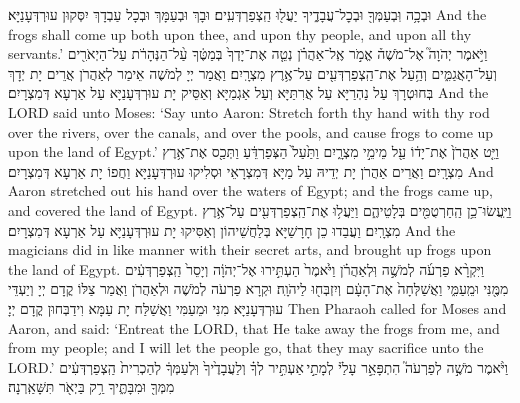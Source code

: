 {{וּבְכָ֥ה וּֽבְעַמְּךָ֖ וּבְכׇל־עֲבָדֶ֑יךָ יַעֲל֖וּ הַֽצְפַרְדְּעִֽים׃
}
{וּבָךְ וּבְעַמָּךְ וּבְכָל עַבְדָךְ יִסְּקוּן עוּרְדְּעָנַיָּא׃}
{And the frogs shall come up both upon thee, and upon thy people, and upon all thy servants.’}{}
\newperek
{}%
{וַיֹּ֣אמֶר יְהֹוָה֮ אֶל־מֹשֶׁה֒ אֱמֹ֣ר אֶֽל־אַהֲרֹ֗ן נְטֵ֤ה אֶת־יָדְךָ֙ בְּמַטֶּ֔ךָ עַ֨ל־הַנְּהָרֹ֔ת עַל־הַיְאֹרִ֖ים וְעַל־הָאֲגַמִּ֑ים וְהַ֥עַל אֶת־הַֽצְפַרְדְּעִ֖ים עַל־אֶ֥רֶץ מִצְרָֽיִם׃}
{וַאֲמַר יְיָ לְמֹשֶׁה אֵימַר לְאַהֲרֹן אֲרֵים יָת יְדָךְ בְּחוּטְרָךְ עַל נַהְרַיָּא עַל אֲרִתַּיָּא וְעַל אַגְמַיָּא וְאַסֵּיק יָת עוּרְדְּעָנַיָּא עַל אַרְעָא דְּמִצְרָיִם׃}
{And the LORD said unto Moses: ‘Say unto Aaron: Stretch forth thy hand with thy rod over the rivers, over the canals, and over the pools, and cause frogs to come up upon the land of Egypt.’}{}
{וַיֵּ֤ט אַהֲרֹן֙ אֶת־יָד֔וֹ עַ֖ל מֵימֵ֣י מִצְרָ֑יִם וַתַּ֙עַל֙ הַצְּפַרְדֵּ֔עַ וַתְּכַ֖ס אֶת־אֶ֥רֶץ מִצְרָֽיִם׃
}
{וַאֲרֵים אַהֲרֹן יָת יְדֵיהּ עַל מַיָּא דְּמִצְרָאֵי וּסְלִיקוּ עוּרְדְּעָנַיָּא וַחֲפוֹ יָת אַרְעָא דְּמִצְרָיִם׃}
{And Aaron stretched out his hand over the waters of Egypt; and the frogs came up, and covered the land of Egypt.}{}
{וַיַּֽעֲשׂוּ־כֵ֥ן הַֽחַרְטֻמִּ֖ים בְּלָטֵיהֶ֑ם וַיַּעֲל֥וּ אֶת־הַֽצְפַרְדְּעִ֖ים עַל־אֶ֥רֶץ מִצְרָֽיִם׃}
{וַעֲבַדוּ כֵן חָרָשַׁיָּא בְּלַחֲשֵׁיהוֹן וְאַסִּיקוּ יָת עוּרְדְּעָנַיָּא עַל אַרְעָא דְּמִצְרָיִם׃}
{And the magicians did in like manner with their secret arts, and brought up frogs upon the land of Egypt.}{}
{וַיִּקְרָ֨א פַרְעֹ֜ה לְמֹשֶׁ֣ה וּֽלְאַהֲרֹ֗ן וַיֹּ֙אמֶר֙ הַעְתִּ֣ירוּ אֶל־יְהֹוָ֔ה וְיָסֵר֙ הַֽצְפַרְדְּעִ֔ים מִמֶּ֖נִּי וּמֵֽעַמִּ֑י וַאֲשַׁלְּחָה֙ אֶת־הָעָ֔ם וְיִזְבְּח֖וּ לַיהֹוָֽה׃}
{וּקְרָא פַרְעֹה לְמֹשֶׁה וּלְאַהֲרֹן וַאֲמַר צַלּוֹ קֳדָם יְיָ וְיַעְדֵּי עוּרְדְּעָנַיָּא מִנִּי וּמֵעַמִּי וַאֲשַׁלַּח יָת עַמָּא וִידַבְּחוּן קֳדָם יְיָ׃}
{Then Pharaoh called for Moses and Aaron, and said: ‘Entreat the LORD, that He take away the frogs from me, and from my people; and I will let the people go, that they may sacrifice unto the LORD.’}{}
{וַיֹּ֨אמֶר מֹשֶׁ֣ה לְפַרְעֹה֮ הִתְפָּאֵ֣ר עָלַי֒ לְמָתַ֣י \legarmeh  אַעְתִּ֣יר לְךָ֗ וְלַעֲבָדֶ֙יךָ֙ וּֽלְעַמְּךָ֔ לְהַכְרִית֙ הַֽצְפַרְדְּעִ֔ים מִמְּךָ֖ וּמִבָּתֶּ֑יךָ רַ֥ק בַּיְאֹ֖ר תִּשָּׁאַֽרְנָה׃
}}
